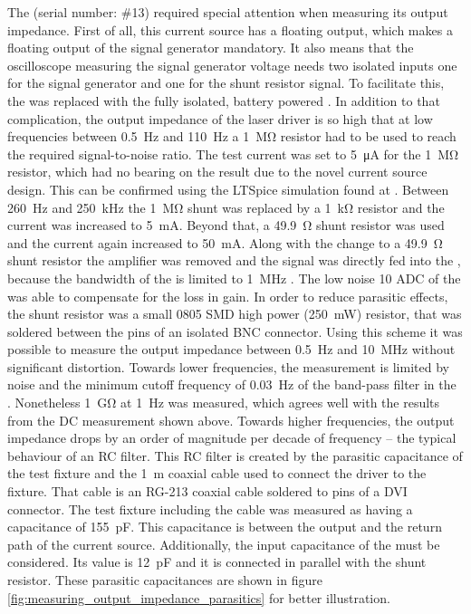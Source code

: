 The  (serial number: \#13) required special attention when measuring its output impedance. First of all, this current source has a floating output, which makes a floating output of the signal generator mandatory. It also means that the oscilloscope measuring the signal generator voltage needs two isolated inputs one for the signal generator and one for the shunt resistor signal. To facilitate this, the  was replaced with the fully isolated, battery powered . In addition to that complication, the output impedance of the laser driver is so high that at low frequencies between \qty{0.5}{\Hz} and \qty{110}{\Hz} a \qty{1}{\mega\ohm} resistor had to be used to reach the required signal-to-noise ratio. The test current was set to \qty{5}{\uA} for the \qty{1}{\mega\ohm} resistor, which had no bearing on the result due to the novel current source design. This can be confirmed using the LTSpice simulation found at . Between \qty{260}{\Hz} and \qty{250}{\kHz} the \qty{1}{\mega\ohm} shunt was replaced by a \qty{1}{\kilo\ohm} resistor and the current was increased to \qty{5}{\mA}. Beyond that, a \qty{49.9}{\ohm} shunt resistor was used and the current again increased to \qty{50}{\mA}. Along with the change to a \qty{49.9}{\ohm} shunt resistor the amplifier was removed and the signal was directly fed into the , because the bandwidth of the  is limited to \qty{1}{\MHz} \cite{datasheet_SR560}. The low noise \qty{10}{\bit} ADC of the  \cite{datasheet_RTH1004} was able to compensate for the loss in gain. In order to reduce parasitic effects, the shunt resistor was a small 0805 SMD high power (\qty{250}{\mW}) resistor, that was soldered between the pins of an isolated BNC connector. Using this scheme it was possible to measure the output impedance between \qty{0.5}{\Hz} and \qty{10}{\MHz} without significant distortion. Towards lower frequencies, the measurement is limited by noise and the minimum cutoff frequency of \qty{0.03}{\Hz} of the band-pass filter in the  \cite{datasheet_SR560}. Nonetheless \qty{1}{\giga\ohm} at \qty{1}{\Hz} was measured, which agrees well with the results from the DC measurement shown above. Towards higher frequencies, the output impedance drops by an order of magnitude per decade of frequency -- the typical behaviour of an RC filter. This RC filter is created by the parasitic capacitance of the test fixture and the \qty{1}{\m} coaxial cable used to connect the driver to the fixture. That cable is an RG-213 coaxial cable soldered to pins of a DVI connector. The test fixture including the cable was measured as having a capacitance of \qty{155}{\pF}. This capacitance is between the output and the return path of the current source. Additionally, the input capacitance of the  must be considered. Its value is \qty{12}{\pF} \cite{datasheet_RTH1004} and it is connected in parallel with the shunt resistor. These parasitic capacitances are shown in figure \ref{fig:measuring_output_impedance_parasitics} for better illustration.
